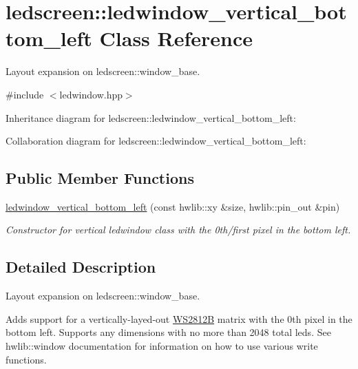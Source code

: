 \hypertarget{classledscreen_1_1ledwindow__vertical__bottom__left}{}\section{ledscreen\+:\+:ledwindow\+\_\+vertical\+\_\+bottom\+\_\+left Class Reference}
\label{classledscreen_1_1ledwindow__vertical__bottom__left}


Layout expansion on ledscreen\+::window\+\_\+base.  




{\ttfamily \#include $<$ledwindow.\+hpp$>$}



Inheritance diagram for ledscreen\+:\+:ledwindow\+\_\+vertical\+\_\+bottom\+\_\+left\+:


Collaboration diagram for ledscreen\+:\+:ledwindow\+\_\+vertical\+\_\+bottom\+\_\+left\+:
\subsection*{Public Member Functions}
\begin{DoxyCompactItemize}
\item 
\hyperlink{classledscreen_1_1ledwindow__vertical__bottom__left_afa6fd9240706d39f3b7278a0567c8c45}{ledwindow\+\_\+vertical\+\_\+bottom\+\_\+left} (const hwlib\+::xy \&size, hwlib\+::pin\+\_\+out \&pin)
\begin{DoxyCompactList}\small\item\em Constructor for vertical ledwindow class with the 0th/first pixel in the bottom left. \end{DoxyCompactList}\end{DoxyCompactItemize}


\subsection{Detailed Description}
Layout expansion on ledscreen\+::window\+\_\+base. 

Adds support for a vertically-\/layed-\/out \hyperlink{classledscreen_1_1WS2812B}{W\+S2812B} matrix with the 0th pixel in the bottom left. Supports any dimensions with no more than 2048 total leds. See hwlib\+::window documentation for information on how to use various write functions. 

